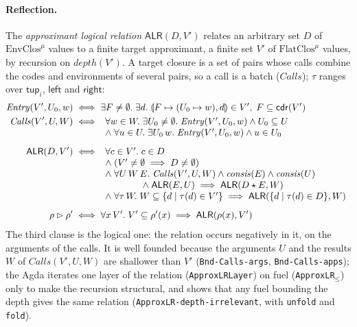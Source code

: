 \documentclass[10pt]{article}
\theoremstyle{acmplain}
\newcommand{\key}[1]{\mathsf{#1}}
\newcommand{\pairv}[2]{\llparenthesis #1, #2 \rrparenthesis}
\newcommand{\app}{\star}
\newcommand{\NE}{\neq\emptyset}
\newcommand{\ApproxLR}[2]{\mathsf{ALR}(#1, #2)}
\newcommand{\consis}{\mathit{consis}}
\newcommand{\Ml}[1]{\textrm{#1}^{\mu}}                  %
\begin{document}
\paragraph{Reflection.}
The \emph{approximant logical relation} $\ApproxLR{D}{V'}$ relates an
arbitrary set $D$ of $\Ml{EnvClos}$ values to a finite target approximant,
a finite set $V'$ of $\Ml{FlatClos}$ values, by recursion on
$\mathit{depth}(V')$. A target closure is a set of pairs whose calls
combine the codes and environments of several pairs, so a call is a batch
($\mathit{Calls}$); $\tau$ ranges over $\key{tup}_i$, $\key{left}$ and
$\key{right}$:
\begin{align*}
  \mathit{Entry}(V', U_0, w) &\iff \exists F \NE.\; \exists d.\;
     \pairv{F \mapsto (U_0 \mapsto w)}{d} \in V',\; F \subseteq \key{cdr}(V') \\
  \mathit{Calls}(V', U, W) &\iff
  \begin{array}[t]{l}
    \forall w \in W.\; \exists U_0 \NE.\; \mathit{Entry}(V', U_0, w) \land U_0 \subseteq U \\
    \land\; \forall u \in U.\; \exists U_0\, w.\; \mathit{Entry}(V', U_0, w) \land u \in U_0
  \end{array} \\[1ex]
  \ApproxLR{D}{V'} &\iff
  \begin{array}[t]{l}
    \forall c \in V'.\; c \in D \\
    \land\; (V' \NE \implies D \NE) \\
    \land\; \forall U\, W\, E.\;
       \mathit{Calls}(V', U, W) \land \consis(E) \land \consis(U) \\
    \qquad\qquad \land\; \ApproxLR{E}{U} \implies \ApproxLR{D \app E}{W} \\
    \land\; \forall \tau\, W.\; W \subseteq \{ d \mid \tau(d) \in V' \}
       \implies \ApproxLR{\{ d \mid \tau(d) \in D \}}{W}
  \end{array} \\[1ex]
  \rho \rhd \rho' &\iff \forall x\, V'.\; V' \subseteq \rho'(x) \implies \ApproxLR{\rho(x)}{V'}
\end{align*}
The third clause is the logical one: the relation occurs negatively in it,
on the arguments of the calls. It is well founded because the arguments
$U$ and the results $W$ of $\mathit{Calls}(V', U, W)$ are shallower than
$V'$ (\texttt{Bnd-Calls-args}, \texttt{Bnd-Calls-apps}); the Agda iterates
one layer of the relation (\texttt{ApproxLRLayer}) on fuel
(\texttt{ApproxLR}$_\leq$) only to make the recursion structural, and shows
that any fuel bounding the depth gives the same relation
(\texttt{ApproxLR-depth-irrelevant}, with \texttt{unfold} and
\texttt{fold}).
\end{document}
